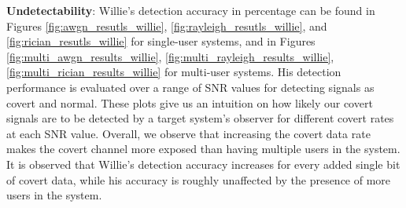 \textbf{Undetectability}: Willie's detection accuracy in percentage can be found in Figures \ref{fig:awgn_resutls_willie}, \ref{fig:rayleigh_resutls_willie}, and \ref{fig:rician_resutls_willie} for single-user systems, and in Figures \ref{fig:multi_awgn_results_willie}, \ref{fig:multi_rayleigh_results_willie}, \ref{fig:multi_rician_results_willie} for multi-user systems. His detection performance is evaluated over a range of SNR values for detecting signals as covert and normal. These plots give us an intuition on how likely our covert signals are to be detected by a target system's observer for different covert rates at each SNR value.
Overall, we observe that increasing the covert data rate makes the covert channel more exposed than having multiple users in the system. It is observed that Willie's detection accuracy increases for every added single bit of covert data, while his accuracy is roughly unaffected by the presence of more users in the system.


